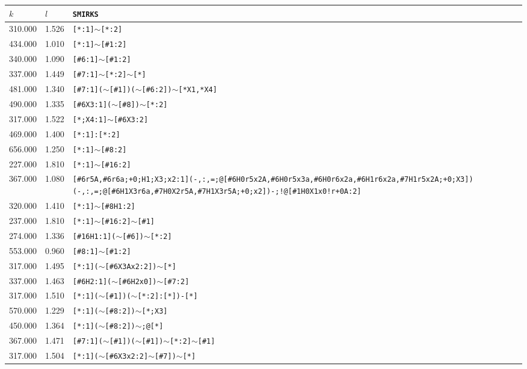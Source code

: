 \begin{longtable}{>{\baselineskip=10pt}p{} >{\baselineskip=10pt}p{} >{\baselineskip=10pt}p{}} 
\hline 
\textbf{$k$} & \textbf{$l$} & \textbf{\texttt{SMIRKS}} \\ 
\hline 
\endhead310.000 & 1.526 & \texttt{[*:1]$\sim$[*:2]} \\ 
434.000 & 1.010 & \texttt{[*:1]$\sim$[\#1:2]} \\ 
340.000 & 1.090 & \texttt{[\#6:1]$\sim$[\#1:2]} \\ 
337.000 & 1.449 & \texttt{[\#7:1]$\sim$[*:2]$\sim$[*]} \\ 
481.000 & 1.340 & \texttt{[\#7:1]($\sim$[\#1])($\sim$[\#6:2])$\sim$[*X1,*X4]} \\ 
490.000 & 1.335 & \texttt{[\#6X3:1]($\sim$[\#8])$\sim$[*:2]} \\ 
317.000 & 1.522 & \texttt{[*;X4:1]$\sim$[\#6X3:2]} \\ 
469.000 & 1.400 & \texttt{[*:1]:[*:2]} \\ 
656.000 & 1.250 & \texttt{[*:1]$\sim$[\#8:2]} \\ 
227.000 & 1.810 & \texttt{[*:1]$\sim$[\#16:2]} \\ 
367.000 & 1.080 & \texttt{[\#6r5A,\#6r6a;+0;H1;X3;x2:1](-,:,=;@[\#6H0r5x2A,\#6H0r5x3a,\#6H0r6x2a,\#6H1r6x2a,\#7H1r5x2A;+0;X3])(-,:,=;@[\#6H1X3r6a,\#7H0X2r5A,\#7H1X3r5A;+0;x2])-;!@[\#1H0X1x0!r+0A:2]} \\ 
320.000 & 1.410 & \texttt{[*:1]$\sim$[\#8H1:2]} \\ 
237.000 & 1.810 & \texttt{[*:1]$\sim$[\#16:2]$\sim$[\#1]} \\ 
274.000 & 1.336 & \texttt{[\#16H1:1]($\sim$[\#6])$\sim$[*:2]} \\ 
553.000 & 0.960 & \texttt{[\#8:1]$\sim$[\#1:2]} \\ 
317.000 & 1.495 & \texttt{[*:1]($\sim$[\#6X3Ax2:2])$\sim$[*]} \\ 
337.000 & 1.463 & \texttt{[\#6H2:1]($\sim$[\#6H2x0])$\sim$[\#7:2]} \\ 
317.000 & 1.510 & \texttt{[*:1]($\sim$[\#1])($\sim$[*:2]:[*])-[*]} \\ 
570.000 & 1.229 & \texttt{[*:1]($\sim$[\#8:2])$\sim$[*;X3]} \\ 
450.000 & 1.364 & \texttt{[*:1]($\sim$[\#8:2])$\sim$;@[*]} \\ 
367.000 & 1.471 & \texttt{[\#7:1]($\sim$[\#1])($\sim$[\#1])$\sim$[*:2]$\sim$[\#1]} \\ 
317.000 & 1.504 & \texttt{[*:1]($\sim$[\#6X3x2:2]$\sim$[\#7])$\sim$[*]} \\ 

\end{longtable}
